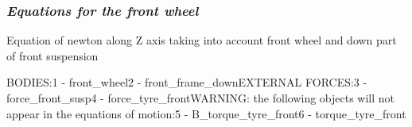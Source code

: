 \documentclass{article}
\begin{document}
\subsubsection{\textbf{\textit{Equations for the front wheel}}}
\begin{maplegroup}
\begin{Maple Normal}{
Equation of newton along Z axis taking into account front wheel and down part of front suspension}\end{Maple Normal}

\end{maplegroup}
\begin{maplegroup}
\begin{mapleinput}
\end{mapleinput}
\mapleresult
BODIES:1 - front\_wheel2 - front\_frame\_downEXTERNAL FORCES:3 - force\_front\_susp4 - force\_tyre\_frontWARNING: the following objects will not appear in the equations of motion:5 - B\_torque\_tyre\_front6 - torque\_tyre\_front
\mapleresult
\begin{maplelatex}
\end{maplelatex}
\end{maplegroup}
\end{document}
